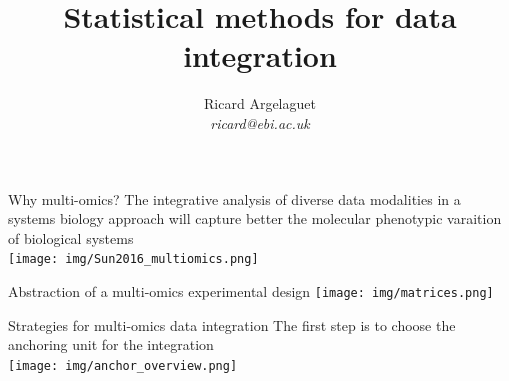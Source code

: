 \documentclass[aspectratio=169,notes]{beamer}
\title{Statistical methods for data integration}
\author{Ricard Argelaguet \\ \textit{ricard@ebi.ac.uk}}
\institute{European Bioinformatics Institute (EMBL-EBI) \\ University of Cambridge}
\begin{document}
	\begin{frame}
	\titlepage
	\end{frame}
	

	
	\begin{frame}{Why multi-omics?}
	The integrative analysis of diverse data modalities in a systems biology approach will capture better the molecular phenotypic varaition of biological systems\\
	\leavevmode\newline
	\centering
	\texttt{[image: img/Sun2016\_multiomics.png]}
	\end{frame}

	\begin{frame}{Abstraction of a multi-omics experimental design}
	\centering
	\texttt{[image: img/matrices.png]}
	\end{frame}

	\begin{frame}{Strategies for multi-omics data integration}
	The first step is to choose the anchoring unit for the integration \\
	\leavevmode\newline
	\centering
	\texttt{[image: img/anchor\_overview.png]}
	\end{frame}

\end{document}
